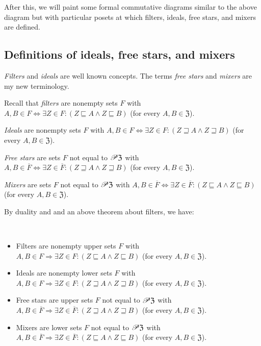 After this, we will paint some formal commutative diagrams similar
to the above diagram but with particular posets at which filters,
ideals, free stars, and mixers are defined.


\subsection{Definitions of ideals, free stars, and mixers}

\emph{Filters} and \emph{ideals} are well known concepts. The terms
\emph{free stars} and \emph{mixers} are my new terminology.

Recall that \emph{filters} are nonempty sets $F$ with $A,B\in F\Leftrightarrow\exists Z\in F:(Z\sqsubseteq A\wedge Z\sqsubseteq B)$
(for every $A,B\in\mathfrak{Z}$).
\begin{defn}
\emph{Ideals} are nonempty sets $F$ with $A,B\in F\Leftrightarrow\exists Z\in F:(Z\sqsupseteq A\wedge Z\sqsupseteq B)$
(for every $A,B\in\mathfrak{Z}$).
\end{defn}

\begin{defn}
\emph{Free stars} are sets $F$ not equal to $\mathscr{P}\mathfrak{Z}$
with $A,B\in\overline{F}\Leftrightarrow\exists Z\in\overline{F}:(Z\sqsupseteq A\wedge Z\sqsupseteq B)$
(for every $A,B\in\mathfrak{Z}$).
\end{defn}

\begin{defn}
\emph{Mixers} are sets $F$ not equal to $\mathscr{P}\mathfrak{Z}$ with
$A,B\in\overline{F}\Leftrightarrow\exists Z\in\overline{F}:(Z\sqsubseteq A\wedge Z\sqsubseteq B)$
(for every $A,B\in\mathfrak{Z}$).
\end{defn}
By duality and and an above theorem about filters, we have:
\begin{prop}
~
\begin{itemize}
\item Filters are nonempty upper sets $F$ with $A,B\in F\Rightarrow\exists Z\in F:(Z\sqsubseteq A\wedge Z\sqsubseteq B)$
(for every $A,B\in\mathfrak{Z}$).
\item Ideals are nonempty lower sets $F$ with $A,B\in F\Rightarrow\exists Z\in F:(Z\sqsupseteq A\wedge Z\sqsupseteq B)$
(for every $A,B\in\mathfrak{Z}$).
\item Free stars are upper sets $F$ not equal to $\mathscr{P}\mathfrak{Z}$
with $A,B\in\overline{F}\Rightarrow\exists Z\in\overline{F}:(Z\sqsupseteq A\wedge Z\sqsupseteq B)$
(for every $A,B\in\mathfrak{Z}$).
\item Mixers are lower sets $F$ not equal to $\mathscr{P}\mathfrak{Z}$ with
$A,B\in\overline{F}\Rightarrow\exists Z\in\overline{F}:(Z\sqsubseteq A\wedge Z\sqsubseteq B)$
(for every $A,B\in\mathfrak{Z}$).
\end{itemize}
\end{prop}

